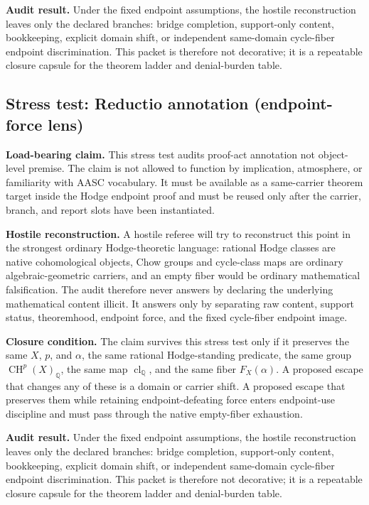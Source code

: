 \documentclass[11pt]{article}
\newcommand{\QQ}{\mathbb{Q}}
\newcommand{\CH}{\operatorname{CH}}
\newcommand{\clQ}{\operatorname{cl}_{\QQ}}
\begin{document}
\par\noindent\textbf{Audit result.} Under the fixed endpoint assumptions, the hostile reconstruction leaves only the declared branches: bridge completion, support-only content, bookkeeping, explicit domain shift, or independent same-domain cycle-fiber endpoint discrimination. This packet is therefore not decorative; it is a repeatable closure capsule for the theorem ladder and denial-burden table.


\subsection{Stress test: Reductio annotation (endpoint-force lens)}

\par\noindent\textbf{Load-bearing claim.} This stress test audits proof-act annotation not object-level premise. The claim is not allowed to function by implication, atmosphere, or familiarity with AASC vocabulary. It must be available as a same-carrier theorem target inside the Hodge endpoint proof and must be reused only after the carrier, branch, and report slots have been instantiated.

\par\noindent\textbf{Hostile reconstruction.} A hostile referee will try to reconstruct this point in the strongest ordinary Hodge-theoretic language: rational Hodge classes are native cohomological objects, Chow groups and cycle-class maps are ordinary algebraic-geometric carriers, and an empty fiber would be ordinary mathematical falsification. The audit therefore never answers by declaring the underlying mathematical content illicit. It answers only by separating raw content, support status, theoremhood, endpoint force, and the fixed cycle-fiber endpoint image.

\par\noindent\textbf{Closure condition.} The claim survives this stress test only if it preserves the same $X$, $p$, and $\alpha$, the same rational Hodge-standing predicate, the same group $\CH^p(X)_\QQ$, the same map $\clQ$, and the same fiber $F_X(\alpha)$. A proposed escape that changes any of these is a domain or carrier shift. A proposed escape that preserves them while retaining endpoint-defeating force enters endpoint-use discipline and must pass through the native empty-fiber exhaustion.

\par\noindent\textbf{Audit result.} Under the fixed endpoint assumptions, the hostile reconstruction leaves only the declared branches: bridge completion, support-only content, bookkeeping, explicit domain shift, or independent same-domain cycle-fiber endpoint discrimination. This packet is therefore not decorative; it is a repeatable closure capsule for the theorem ladder and denial-burden table.
\end{document}
